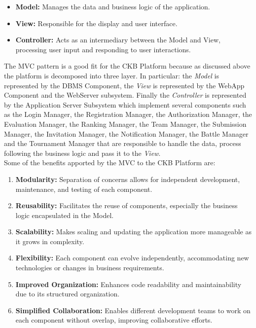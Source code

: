 \begin{itemize}
    \item \textbf{Model:} Manages the data and business logic of the application.
    \item \textbf{View:} Responsible for the display and user interface.
    \item \textbf{Controller:} Acts as an intermediary between the Model and View, processing user input and responding to user interactions.
\end{itemize}
The MVC pattern is a good fit for the CKB Platform because as discussed above the platform is decomposed into three layer. In particular: the \textit{Model} is represented by the DBMS Component, the \textit{View} is represented by the WebApp Component and the WebServer subsystem. Finally the \textit{Controller} is represented by the Application Server Subsystem which implement several components such as the Login Manager, the Registration Manager, the Authorization Manager, the Evaluation Manager, the Ranking Manager, the Team Manager, the Submission Manager, the Invitation Manager, the Notification Manager, the Battle Manager and the Tournament Manager that are responsible to handle the data, process following the business logic and pass it to the \textit{View}. \\
Some of the benefits apported by the MVC to the CKB Platform are:

\begin{enumerate}
    \item \textbf{Modularity:} Separation of concerns allows for independent development, maintenance, and testing of each component.
    \item \textbf{Reusability:} Facilitates the reuse of components, especially the business logic encapsulated in the Model.
    \item \textbf{Scalability:} Makes scaling and updating the application more manageable as it grows in complexity.
    \item \textbf{Flexibility:} Each component can evolve independently, accommodating new technologies or changes in business requirements.
    \item \textbf{Improved Organization:} Enhances code readability and maintainability due to its structured organization.
    \item \textbf{Simplified Collaboration:} Enables different development teams to work on each component without overlap, improving collaborative efforts.
\end{enumerate}

